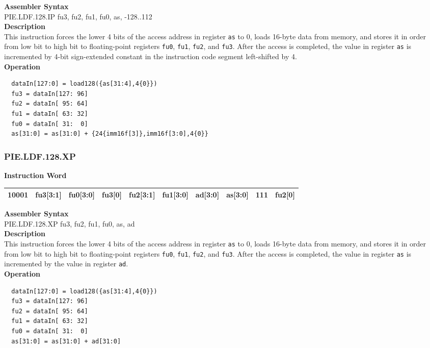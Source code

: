 \textbf{Assembler Syntax} \\
PIE.LDF.128.IP fu3, fu2, fu1, fu0, as, -128..112 \\
\textbf{Description} \\
This instruction forces the lower 4 bits of the access address in register \lstinline{as} to 0, loads 16-byte data from memory, and stores it in order from low bit to high bit to floating-point registers \lstinline{fu0}, \lstinline{fu1}, \lstinline{fu2}, and \lstinline{fu3}. After the access is completed, the value in register \lstinline{as} is incremented by 4-bit sign-extended constant in the instruction code segment left-shifted by 4.\\
\textbf{Operation}
\begin{lstlisting}
  dataIn[127:0] = load128({as[31:4],4{0}})
  fu3 = dataIn[127: 96]
  fu2 = dataIn[ 95: 64]
  fu1 = dataIn[ 63: 32]
  fu0 = dataIn[ 31:  0]
  as[31:0] = as[31:0] + {24{imm16f[3]},imm16f[3:0],4{0}}
\end{lstlisting}

\newpage
\subsubsection{PIE.LDF.128.XP}\label{instruction:PIELDF128XP}
\setlength\tabcolsep{6pt}
\textbf{Instruction Word} \\
\begin{tabular}{|c|c|c|c|c|c|c|c|c|c|}
	\hline
	10001 & fu3[3:1] & fu0[3:0] & fu3[0] & fu2[3:1] & fu1[3:0] & ad[3:0] & as[3:0] & 111 & fu2[0] \\
	\hline
\end{tabular}

\textbf{Assembler Syntax} \\
PIE.LDF.128.XP fu3, fu2, fu1, fu0, as, ad \\
\textbf{Description} \\
This instruction forces the lower 4 bits of the access address in register \lstinline{as} to 0, loads 16-byte data from memory, and stores it in order from low bit to high bit to floating-point registers \lstinline{fu0}, \lstinline{fu1}, \lstinline{fu2}, and \lstinline{fu3}. After the access is completed, the value in register \lstinline{as} is incremented by the value in register \lstinline{ad}.\\
\textbf{Operation}
\begin{lstlisting}
  dataIn[127:0] = load128({as[31:4],4{0}})
  fu3 = dataIn[127: 96]
  fu2 = dataIn[ 95: 64]
  fu1 = dataIn[ 63: 32]
  fu0 = dataIn[ 31:  0]
  as[31:0] = as[31:0] + ad[31:0]
\end{lstlisting}

